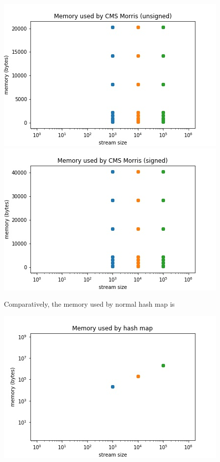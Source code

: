 \documentclass[a4paper, 11pt]{article}
\begin{document}
        \begin{center}
            \includegraphics[scale=0.5]{memory_morris_unsigned}
            \includegraphics[scale=0.5]{memory_morris_signed}
        \end{center}

        \noindent Comparatively, the memory used by normal hash map is \\

        \begin{center}
            \includegraphics[scale=0.5]{memory}
        \end{center}
\end{document}
